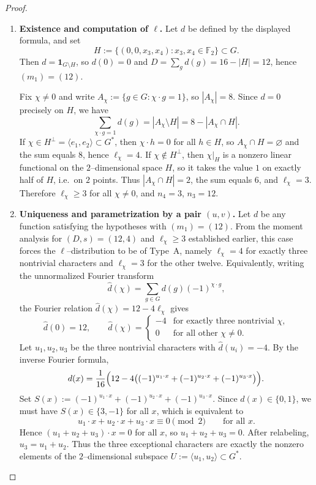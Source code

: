 \documentclass[12pt,twoside,]{amsart}
\theoremstyle{plain}
\theoremstyle{definition}
\begin{document}
\begin{proof}
\begin{enumerate}
\item \textbf{Existence and computation of $\ell$.}
Let $d$ be defined by the displayed formula, and set
\[
H:=\{(0,0,x_3,x_4): x_3,x_4\in\mathbb F_2\}\subset G.
\]
Then $d=\mathbf 1_{G\setminus H}$, so $d(0)=0$ and $D=\sum_g d(g)=16-|H|=12$,
hence $(m_1)=(12)$.

Fix $\chi\neq 0$ and write $A_\chi:=\{g\in G:\chi\cdot g=1\}$, so $|A_\chi|=8$.
Since $d=0$ precisely on $H$, we have
\[
\sum_{\chi\cdot g=1} d(g)=|A_\chi\setminus H|=8-|A_\chi\cap H|.
\]
If $\chi\in H^\perp=\langle e_1,e_2\rangle\subset G^*$, then $\chi\cdot h=0$ for
all $h\in H$, so $A_\chi\cap H=\varnothing$ and the sum equals $8$, hence
$\ell_\chi=4$.  If $\chi\notin H^\perp$, then $\chi|_H$ is a nonzero linear
functional on the $2$--dimensional space $H$, so it takes the value $1$ on
exactly half of $H$, i.e.\ on $2$ points. Thus $|A_\chi\cap H|=2$, the sum
equals $6$, and $\ell_\chi=3$. Therefore $\ell_\chi\ge 3$ for all $\chi\neq 0$,
and $n_4=3$, $n_3=12$.

\item \textbf{Uniqueness and parametrization by a pair $(u,v)$.}
Let $d$ be any function satisfying the hypotheses with $(m_1)=(12)$.
From the moment analysis for $(D,s)=(12,4)$ and $\ell_\chi\ge 3$ established
earlier, this case forces the $\ell$--distribution to be of Type~A, namely
$\ell_\chi=4$ for exactly three nontrivial characters and $\ell_\chi=3$ for the
other twelve. Equivalently, writing the unnormalized Fourier transform
\[
\widehat d(\chi)=\sum_{g\in G} d(g)(-1)^{\chi\cdot g},
\]
the Fourier relation $\widehat d(\chi)=12-4\ell_\chi$ gives
\[
\widehat d(0)=12,\qquad
\widehat d(\chi)=
\begin{cases}
-4 & \text{for exactly three nontrivial }\chi,\\
0  & \text{for all other }\chi\neq 0.
\end{cases}
\]
Let $u_1,u_2,u_3$ be the three nontrivial characters with $\widehat d(u_i)=-4$.
By the inverse Fourier formula,
\[
d(x)=\frac{1}{16}\Bigl(12
-4\bigl((-1)^{u_1\cdot x}+(-1)^{u_2\cdot x}+(-1)^{u_3\cdot x}\bigr)\Bigr).
\]
Set $S(x):=(-1)^{u_1\cdot x}+(-1)^{u_2\cdot x}+(-1)^{u_3\cdot x}$.
Since $d(x)\in\{0,1\}$, we must have $S(x)\in\{3,-1\}$ for all $x$, which is
equivalent to
\[
u_1\cdot x+u_2\cdot x+u_3\cdot x\equiv 0 \pmod 2\qquad\text{for all }x.
\]
Hence $(u_1+u_2+u_3)\cdot x=0$ for all $x$, so $u_1+u_2+u_3=0$.
After relabeling, $u_3=u_1+u_2$. Thus the three exceptional characters are
exactly the nonzero elements of the $2$--dimensional subspace
$U:=\langle u_1,u_2\rangle\subset G^*$.


\end{enumerate}
\end{proof}
\end{document}
